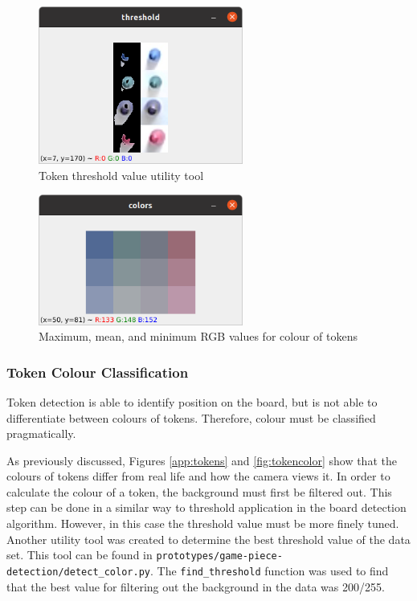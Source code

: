 \documentclass[12pt]{article}
\begin{document}
\begin{figure}[h]
    \centering
    \includegraphics[width=0.6\textwidth]{images/figures/fig13}
    \caption{Token threshold value utility tool}
    \label{fig:threshold}
\end{figure}

\begin{figure}[h]
    \centering
    \includegraphics[width=0.6\textwidth]{images/figures/fig14}
    \caption{Maximum, mean, and minimum RGB values for colour of tokens}
    \label{fig:tokenrgb}
\end{figure}

\subsubsection{Token Colour Classification}
Token detection is able to identify position on the board, but is not able to differentiate between colours of tokens. Therefore, colour must be classified pragmatically. 

As previously discussed, Figures \ref{app:tokens} and \ref{fig:tokencolor} show that the colours of tokens differ from real life and how the camera views it. 
In order to calculate the colour of a token, the background must first be filtered out. 
This step can be done in a similar way to threshold application in the board detection algorithm. 
However, in this case the threshold value must be more finely tuned. 
Another utility tool was created to determine the best threshold value of the data set. 
This tool can be found in \texttt{prototypes/game-piece-detection/detect\_color.py}. 
The \texttt{find\_threshold} function was used to find that the best value for filtering out the background in the data was 200/255. 
\end{document}
